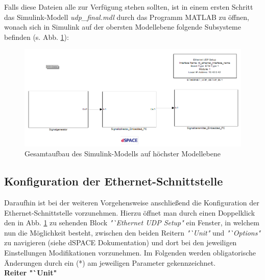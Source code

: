 \documentclass[fontsize = 12pt, paper = a4]{scrreprt}
\begin{document}
Falls diese Dateien alle zur Verfügung stehen sollten, ist in einem ersten Schritt das Simulink-Modell \textit{udp\_final.mdl} durch das Programm MATLAB zu öffnen, wonach sich in Simulink auf der obersten Modellebene  folgende Subsysteme befinden (s. Abb. \ref{topmodell}):

\begin{figure}[h]
\centering
\includegraphics[scale = 0.65]{topmodell}
\caption[Gesamtaufbau Simulink-Modell]{Gesamtaufbau des Simulink-Modells auf höchster Modellebene}
\label{topmodell}
\end{figure} 

\newpage


\subsection{Konfiguration der Ethernet-Schnittstelle}

Daraufhin ist bei der weiteren Vorgehensweise anschließend die Konfiguration der Ethernet-Schnittstelle vorzunehmen. Hierzu öffnet man durch einen Doppelklick den in Abb. \ref{topmodell} zu sehenden Block \textit{"`Ethernet UDP Setup"} ein Fenster, in welchem nun die Möglichkeit besteht, zwischen den beiden Reitern \textit{"`Unit"} und \textit{"`Options"} zu navigieren (siehe dSPACE Dokumentation) und dort bei den jeweiligen Einstellungen Modifikationen vorzunehmen. Im Folgenden werden obligatorische Änderungen durch ein (*) am jeweiligen Parameter gekennzeichnet. \\

\textbf{Reiter "`Unit"} 
\end{document}
